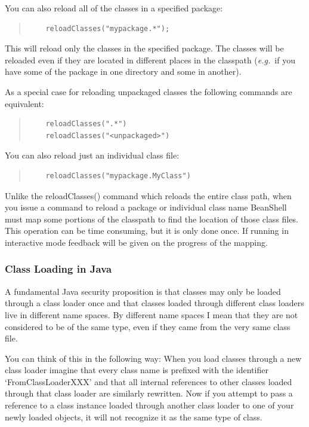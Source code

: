 \documentclass[twoside,11pt]{article}
\renewcommand{\_}{\texttt{\symbol{95}}}
\newcommand{\eg}{\textit{e.g.}}
\begin{document}
You can also reload all of the classes in a specified package:
\begin{quote}
\begin{verbatim}
    reloadClasses("mypackage.*");
\end{verbatim}
\end{quote}

This will reload only the classes in the specified package.  The
classes will be reloaded even if they are located in different places
in the classpath (\eg\  if you have some of the package in one
directory and some in another).

As a special case for reloading unpackaged classes the following
commands are equivalent:
\begin{quote}
\begin{verbatim}
    reloadClasses(".*")
    reloadClasses("<unpackaged>")
\end{verbatim}
\end{quote}

You can also reload just an individual class file:
\begin{quote}
\begin{verbatim}
    reloadClasses("mypackage.MyClass")
\end{verbatim}
\end{quote}

Unlike the reloadClasses() command which reloads the entire class path,
when you issue a command to reload a package or individual class name
BeanShell must map some portions of the classpath to find the location
of those class files.  This operation can be time consuming, but it is
only done once.  If running in interactive mode feedback will be given
on the progress of the mapping.

\subsubsection{Class Loading in Java}

A fundamental Java security proposition is that classes may only be
loaded through a class loader once and that classes loaded through
different class loaders live in different name spaces.  By different
name spaces I mean that they are not considered to be of the same
type, even if they came from the very same class file.

You can think of this in the following way: When you load classes
through a new class loader imagine that every class name is prefixed
with the identifier `FromClassLoaderXXX' and that all internal
references to other classes loaded through that class loader are
similarly rewritten.  Now if you attempt to pass a reference to a
class instance loaded through another class loader to one of your
newly loaded objects, it will not recognize it as the same type of
class.
\end{document}
